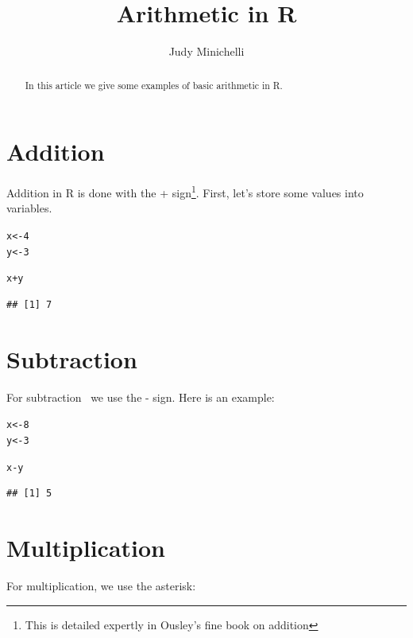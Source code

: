 \documentclass{article}\usepackage[]{graphicx}\usepackage[]{color}
\makeatletter
\newcommand{\hlnum}[1]{\textcolor[rgb]{0.686,0.059,0.569}{#1}}%
\newcommand{\hlopt}[1]{\textcolor[rgb]{0,0,0}{#1}}%
\newcommand{\hlstd}[1]{\textcolor[rgb]{0.345,0.345,0.345}{#1}}%
\newcommand{\hlkwb}[1]{\textcolor[rgb]{0.69,0.353,0.396}{#1}}%
\newenvironment{kframe}{%
 \def\at@end@of@kframe{}%
 \ifinner\ifhmode%
  \def\at@end@of@kframe{\end{minipage}}%
  \begin{minipage}{\columnwidth}%
 \fi\fi%
 \def\FrameCommand##1{\hskip\@totalleftmargin \hskip-\fboxsep
 \colorbox{shadecolor}{##1}\hskip-\fboxsep
     \hskip-\linewidth \hskip-\@totalleftmargin \hskip\columnwidth}%
 \MakeFramed {\advance\hsize-\width
   \@totalleftmargin\z@ \linewidth\hsize
   \@setminipage}}%
 {\par\unskip\endMakeFramed%
 \at@end@of@kframe}
\newenvironment{knitrout}{}{} %
\makeatother
\begin{document}
\title{Arithmetic in R}
\author{Judy Minichelli}
\maketitle

\begin{abstract}
In this article we give some examples of basic arithmetic in R.
\end{abstract}

\section{Addition}
Addition in R is done with the + sign\footnote{This is detailed expertly in Ousley's fine book on addition}. First, let's store some values into variables.

\begin{knitrout}
\color{fgcolor}\begin{kframe}
\begin{alltt}
\hlstd{x}\hlkwb{<-}\hlnum{4}
\hlstd{y}\hlkwb{<-}\hlnum{3}

\hlstd{x}\hlopt{+}\hlstd{y}
\end{alltt}
\begin{verbatim}
## [1] 7
\end{verbatim}
\end{kframe}
\end{knitrout}

\section{Subtraction}
For subtraction \, we use the - sign.  Here is an example:

\begin{knitrout}
\color{fgcolor}\begin{kframe}
\begin{alltt}
\hlstd{x}\hlkwb{<-}\hlnum{8}
\hlstd{y}\hlkwb{<-}\hlnum{3}

\hlstd{x}\hlopt{-}\hlstd{y}
\end{alltt}
\begin{verbatim}
## [1] 5
\end{verbatim}
\end{kframe}
\end{knitrout}

\section{Multiplication}
For multiplication, we use the asterisk:
\end{document}
